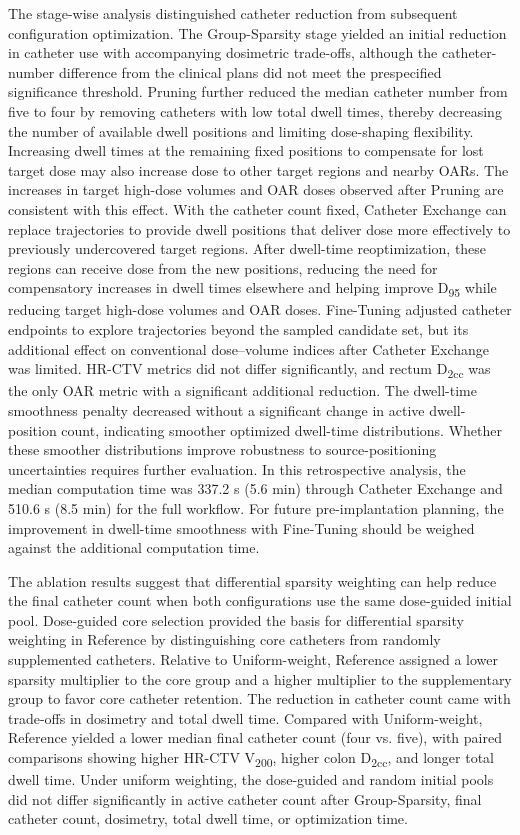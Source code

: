 \documentclass[12pt,twoside,letterpaper]{article}
\begin{document}
The stage-wise analysis distinguished catheter reduction from subsequent configuration optimization. The Group-Sparsity stage yielded an initial reduction in catheter use with accompanying dosimetric trade-offs, although the catheter-number difference from the clinical plans did not meet the prespecified significance threshold. Pruning further reduced the median catheter number from five to four by removing catheters with low total dwell times, thereby decreasing the number of available dwell positions and limiting dose-shaping flexibility. Increasing dwell times at the remaining fixed positions to compensate for lost target dose may also increase dose to other target regions and nearby OARs. The increases in target high-dose volumes and OAR doses observed after Pruning are consistent with this effect. With the catheter count fixed, Catheter Exchange can replace trajectories to provide dwell positions that deliver dose more effectively to previously undercovered target regions. After dwell-time reoptimization, these regions can receive dose from the new positions, reducing the need for compensatory increases in dwell times elsewhere and helping improve D\textsubscript{95} while reducing target high-dose volumes and OAR doses. Fine-Tuning adjusted catheter endpoints to explore trajectories beyond the sampled candidate set, but its additional effect on conventional dose--volume indices after Catheter Exchange was limited. HR-CTV metrics did not differ significantly, and rectum D\textsubscript{2cc} was the only OAR metric with a significant additional reduction. The dwell-time smoothness penalty decreased without a significant change in active dwell-position count, indicating smoother optimized dwell-time distributions. Whether these smoother distributions improve robustness to source-positioning uncertainties requires further evaluation. In this retrospective analysis, the median computation time was 337.2 s (5.6 min) through Catheter Exchange and 510.6 s (8.5 min) for the full workflow. For future pre-implantation planning, the improvement in dwell-time smoothness with Fine-Tuning should be weighed against the additional computation time.

The ablation results suggest that differential sparsity weighting can help reduce the final catheter count when both configurations use the same dose-guided initial pool. Dose-guided core selection provided the basis for differential sparsity weighting in Reference by distinguishing core catheters from randomly supplemented catheters. Relative to Uniform-weight, Reference assigned a lower sparsity multiplier to the core group and a higher multiplier to the supplementary group to favor core catheter retention. The reduction in catheter count came with trade-offs in dosimetry and total dwell time. Compared with Uniform-weight, Reference yielded a lower median final catheter count (four vs. five), with paired comparisons showing higher HR-CTV V\textsubscript{200}, higher colon D\textsubscript{2cc}, and longer total dwell time. Under uniform weighting, the dose-guided and random initial pools did not differ significantly in active catheter count after Group-Sparsity, final catheter count, dosimetry, total dwell time, or optimization time.
\end{document}
